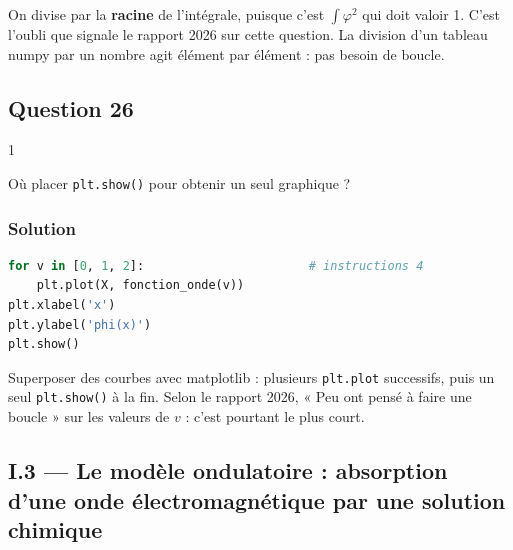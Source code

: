 \documentclass[11pt,a4paper]{article}
\begin{document}
\begin{piege}

On divise par la \textbf{racine} de l'intégrale, puisque c'est \(\int\varphi^2\) qui doit valoir 1. C'est l'oubli que signale le rapport 2026 sur cette question. La division d'un tableau numpy par un nombre agit élément par élément : pas besoin de boucle.

\end{piege}

\hypertarget{question-26}{%
\subsection{Question 26}\label{question-26}}

\begin{indication}{1}

Où placer \texttt{plt.show()} pour obtenir un seul graphique ?

\end{indication}

\hypertarget{solution-25}{%
\subsubsection{Solution}\label{solution-25}}

\begin{lstlisting}[language=Python]
for v in [0, 1, 2]:                       # instructions 4
    plt.plot(X, fonction_onde(v))
plt.xlabel('x')
plt.ylabel('phi(x)')
plt.show()
\end{lstlisting}

\begin{methode}

Superposer des courbes avec matplotlib : plusieurs \texttt{plt.plot} successifs, puis un seul \texttt{plt.show()} à la fin. Selon le rapport 2026, « Peu ont pensé à faire une boucle » sur les valeurs de \(v\) : c'est pourtant le plus court.

\end{methode}

\hypertarget{i.3-le-moduxe8le-ondulatoire-absorption-dune-onde-uxe9lectromagnuxe9tique-par-une-solution-chimique}{%
\subsection{I.3 --- Le modèle ondulatoire : absorption d'une onde électromagnétique par une solution chimique}\label{i.3-le-moduxe8le-ondulatoire-absorption-dune-onde-uxe9lectromagnuxe9tique-par-une-solution-chimique}}
\end{document}
